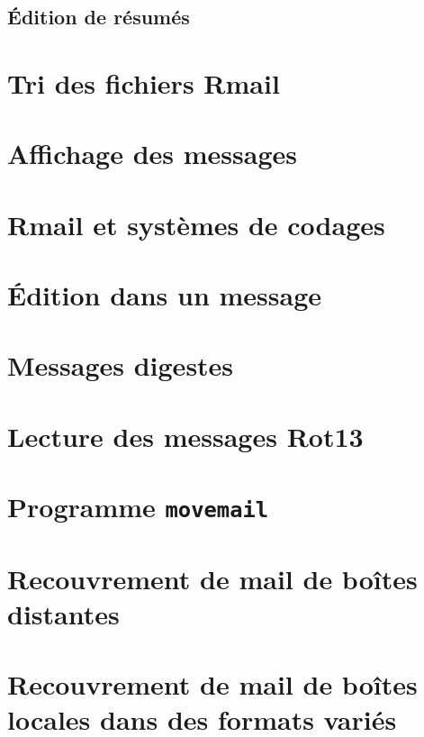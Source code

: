 \subsection{\'Edition de résumés}\label{chap30sec11subsec2}
\section{Tri des fichiers Rmail}\label{chap30sec12}
\section{Affichage des messages}\label{chap30sec13}
\section{Rmail et systèmes de codages}\label{chap30sec14}
\section{\'Edition dans un message}\label{chap30sec15}
\section{Messages digestes}\label{chap30sec16}
\section{Lecture des messages Rot13}\label{chap30sec17}
\section{Programme \texttt{movemail}}\label{chap30sec18}
\section{Recouvrement de mail de boîtes distantes}\label{chap30sec19}
\section{Recouvrement de mail de boîtes locales dans des formats
  variés}\label{chap30sec20}
